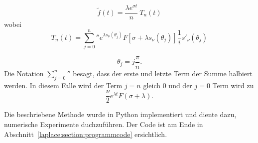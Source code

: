 \begin{equation}
\tilde{f}(t) = \frac{\lambda e^{\sigma t}}{n}~T_{n}(t)
\end{equation}
wobei 
\begin{equation}
T_{n}(t)
=
{\sum_{j=0}^n}'' e^{\lambda s_{\nu}(\theta_{j})}
F[\sigma + \lambda s_{\nu}(\theta_{j})]
\frac{1}{i} s'_{\nu}(\theta_{j})
\end{equation}

\begin{equation}
\theta_{j} = j \frac{\pi}{n}.
\end{equation}
Die Notation ${\sum_{j=0}^n}''$ besagt, dass der erste und letzte
Term der Summe halbiert werden.
In diesem Falle wird der Term $j=n$ gleich 0 und der $j=0$ Term wird zu
\begin{equation}
\frac{\nu}{2}e^{\lambda t}F(\sigma + \lambda).
\end{equation}


Die beschriebene Methode wurde in Python implementiert und diente
dazu, numerische Experimente duchzuführen.
%
Der Code ist am Ende in Abschnitt~\ref{laplace:section:programmcode}
ersichtlich.

